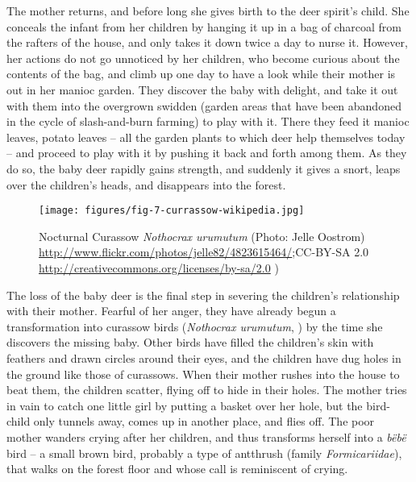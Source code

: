 \documentclass[output=paper,
modfonts,nonflat
]{langsci/langscibook}
\begin{document}
    The mother returns, and before long she gives birth to the deer spirit’s child. She conceals the infant from her children by hanging it up in a bag of charcoal from the rafters of the house, and only takes it down twice a day to nurse it. However, her actions do not go unnoticed by her children, who become curious about the contents of the bag, and climb up one day to have a look while their mother is out in her manioc garden. They discover the baby with delight, and take it out with them into the overgrown swidden (garden areas that have been abandoned in the cycle of slash-and-burn farming) to play with it. There they feed it manioc leaves, potato leaves – all the garden plants to which deer help themselves today – and proceed to play with it by pushing it back and forth among them. As they do so, the baby deer rapidly gains strength, and suddenly it gives a snort, leaps over the children’s heads, and disappears into the forest. 
    
    
\begin{figure}[b]
  \texttt{[image: figures/fig-7-currassow-wikipedia.jpg]}
  \caption{Nocturnal Curassow \textit{Nothocrax urumutum} (Photo: Jelle Oostrom) \tiny \url{http://www.flickr.com/photos/jelle82/4823615464/};CC-BY-SA 2.0 \url{http://creativecommons.org/licenses/by-sa/2.0} )} 
  \label{fig:hup:7}
\end{figure}
    

	The loss of the baby deer is the final step in severing the children’s relationship with their mother. Fearful of her anger, they have already begun a transformation into curassow birds (\textit{Nothocrax urumutum}, ) by the time she discovers the missing baby. Other birds have filled the children's skin with feathers and drawn circles around their eyes, and the children have dug holes in the ground like those of curassows. When their mother rushes into the house to beat them, the children scatter, flying off to hide in their holes. The mother tries in vain to catch one little girl by putting a basket over her hole, but the bird-child only tunnels away, comes up in another place, and flies off. The poor mother wanders crying after her children, and thus transforms herself into a \textit{bëbë} bird – a small brown bird, probably a type of antthrush (family \textit{Formicariidae}), that walks on the forest floor and whose call is reminiscent of crying. 
\end{document}
